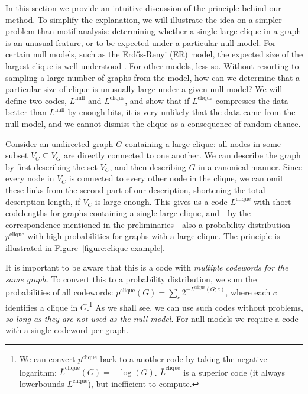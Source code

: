 \documentclass[twoside,11pt]{article}
\begin{document}
In this section we provide an intuitive discussion of the principle behind our method. To simplify the explanation, we will illustrate the idea on a simpler problem than motif analysis: determining whether a single large clique in a graph is an unusual feature, or to be expected under a particular null model. For certain null models, such as the Erd\H{o}s-Renyi (ER) model, the expected size of the largest clique is well understood \citep{bollobas1976cliques}. For other models, less so. Without resorting to sampling a large number of graphs from the model, how can we determine that a particular size of clique is unusually large under a given null model? We will define two codes, $L^\text{null}$ and $L^\text{clique}$, and show that if $L^\text{clique}$ compresses the data better than $L^\text{null}$ by enough bits, it is very unlikely that the data came from the null model, and we cannot dismiss the clique as a consequence of random chance.

Consider an undirected graph $G$ containing a large clique: all nodes in some subset $V_C \subseteq V_G$ are directly connected to one another. We can describe the graph by first describing the set $V_C$, and then describing $G$ in a canonical manner. Since every node in $V_C$ is connected to every other node in the clique, we can omit these links from the second part of our description, shortening the total description length, if $V_C$ is large enough. This gives us a code $L^\text{clique}$ with short codelengths for graphs containing a single large clique, and---by the correspondence mentioned in the preliminaries---also a probability distribution $p^\text{clique}$ with high probabilities for graphs with a large clique. The principle is illustrated in Figure~\ref{figure:clique-example}.

It is important to be aware that this is a code with \emph{multiple codewords for the same graph}. To convert this to a probability distribution, we sum the probabilities of all codewords: $p^\text{clique}(G) = \sum_c 2^{-L^\text{clique}(G;c)}$, where each $c$ identifies a clique in $G$.\footnote{We can convert $p^\text{clique}$ back to a another code by taking the negative logarithm: $\bar L^\text{clique}(G) = -\log(G)$. $\bar L^\text{clique}$ is a superior code (it always lowerbounds $L^\text{clique}$), but inefficient to compute.} As we shall see, we can use such codes without problems, \emph{so long as they are not used as the null model}. For null models we require a code with a single codeword per graph.
\end{document}
